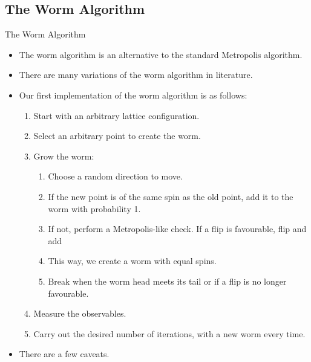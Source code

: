 \documentclass{beamer}
\begin{document}
\subsection{The Worm Algorithm}
\begin{frame}{The Worm Algorithm}
\begin{itemize}
    \item The worm algorithm is an alternative to the standard Metropolis algorithm.
\end{itemize}
\end{frame}

\begin{frame}
\begin{itemize}
    \item There are many variations of the worm algorithm in literature.
    \item Our first implementation of the worm algorithm is as follows:
    \begin{enumerate}
        \item Start with an arbitrary lattice configuration.\footnotemark
        \item Select an arbitrary point to create the worm.
        \item Grow the worm: \\
        \begin{enumerate}
            \item Choose a random direction to move.
            \item If the new point is of the same spin as the old point, add it to the worm with probability 1.
            \item If not, perform a Metropolis-like check. If a flip is favourable, flip and add
            \item This way, we create a worm with equal spins.
            \item Break when the worm head meets its tail or if a flip is no longer favourable.
        \end{enumerate}
        \item Measure the observables.
        \item Carry out the desired number of iterations, with a new worm every time.
    \end{enumerate}
    \item There are a few caveats.
\end{itemize}
\end{frame}
\end{document}
